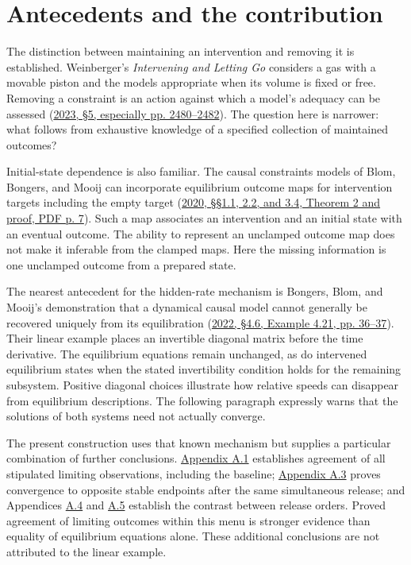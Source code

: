 \section*{Antecedents and the contribution}

The distinction between maintaining an intervention and removing it is established. Weinberger’s \emph{Intervening and Letting Go} considers a gas with a movable piston and the models appropriate when its volume is fixed or free. Removing a constraint is an action against which a model’s adequacy can be assessed (\hyperlink{ref:weinberger2023}{2023, §5, especially pp. 2480–2482}). The question here is narrower: what follows from exhaustive knowledge of a specified collection of maintained outcomes?

Initial-state dependence is also familiar. The causal constraints models of Blom, Bongers, and Mooij can incorporate equilibrium outcome maps for intervention targets including the empty target (\hyperlink{ref:blom2020}{2020, §§1.1, 2.2, and 3.4, Theorem 2 and proof, PDF p. 7}). Such a map associates an intervention and an initial state with an eventual outcome. The ability to represent an unclamped outcome map does not make it inferable from the clamped maps. Here the missing information is one unclamped outcome from a prepared state.

The nearest antecedent for the hidden-rate mechanism is Bongers, Blom, and Mooij’s demonstration that a dynamical causal model cannot generally be recovered uniquely from its equilibration (\hyperlink{ref:bongers2022}{2022, §4.6, Example 4.21, pp. 36–37}). Their linear example places an invertible diagonal matrix before the time derivative. The equilibrium equations remain unchanged, as do intervened equilibrium states when the stated invertibility condition holds for the remaining subsystem. Positive diagonal choices illustrate how relative speeds can disappear from equilibrium descriptions. The following paragraph expressly warns that the solutions of both systems need not actually converge.

The present construction uses that known mechanism but supplies a particular combination of further conclusions. \hyperref[app:a.1]{Appendix A.1} establishes agreement of all stipulated limiting observations, including the baseline; \hyperref[app:a.3]{Appendix A.3} proves convergence to opposite stable endpoints after the same simultaneous release; and Appendices \hyperref[app:a.4]{A.4} and \hyperref[app:a.5]{A.5} establish the contrast between release orders. Proved agreement of limiting outcomes within this menu is stronger evidence than equality of equilibrium equations alone. These additional conclusions are not attributed to the linear example.

